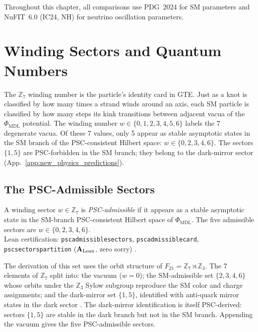 \documentclass[11pt,openany]{book}
\theoremstyle{remark}
\newcommand{\PHIMDL}{\Phi_{\mathrm{MDL}}}
\newcommand{\ZS}{\mathbb{Z}_7}
\newcommand{\lean}[1]{%
  \penalty-100
  \begingroup\def\_{\textunderscore\allowbreak}\texttt{#1}\endgroup}
\newcommand{\CatAL}{\ensuremath{\textbf{A}_{\rm Lean}}}
\begin{document}
Throughout this chapter, all comparisons use PDG~2024 \cite{ParticleDataGroup2024}
for SM parameters and NuFIT~6.0 (IC24, NH) \cite{NuFIT60} for neutrino oscillation
parameters.

\section{Winding Sectors and Quantum Numbers}
\label{sec:winding_qn}

The $\ZS$ winding number is the particle's identity card in GTE.  Just as a knot is
classified by how many times a strand winds around an axis, each SM particle is classified
by how many steps its kink transitions between adjacent vacua of the $\PHIMDL$ potential.
The winding number $w \in \{0,1,2,3,4,5,6\}$ labels the 7 degenerate vacua.  Of these
7 values, only 5 appear as stable asymptotic states in the SM branch of the
PSC-consistent Hilbert space: $w \in \{0,2,3,4,6\}$.  The sectors $\{1,5\}$ are
PSC-forbidden in the SM branch; they belong to the dark-mirror sector
\cite{Spivack2025UGP} (App.~\ref{app:new_physics_predictions}).

\subsection*{The PSC-Admissible Sectors}

\begin{tcolorbox}[colback=green!5,colframe=green!50!black,title={Definition: PSC-Admissible Winding Sector}]
A winding sector $w\in\ZS$ is \emph{PSC-admissible} if it appears as a stable
asymptotic state in the SM-branch PSC-consistent Hilbert space of $\PHIMDL$.
The five admissible sectors are $w\in\{0,2,3,4,6\}$.\\[2pt]
Lean certification: \lean{psc\_admissible\_sectors}, \lean{psc\_admissible\_card},
\lean{psc\_sectors\_partition} (\CatAL, zero sorry)
\cite{SpivackPhiMDLField,SpivackThreeTapeCMCA}.
\end{tcolorbox}

The derivation of this set uses the orbit structure of $F_{21} = \ZS \rtimes \mathbb{Z}_3$.
The 7 elements of $\ZS$ split into: the vacuum ($w=0$); the SM-admissible set
$\{2,3,4,6\}$ whose orbits under the $\mathbb{Z}_3$ Sylow subgroup reproduce the
SM color and charge assignments; and the dark-mirror set $\{1,5\}$, identified with
anti-quark mirror states in the dark sector \cite{Spivack2025UGP}.  The dark-mirror
identification is itself PSC-derived: sectors $\{1,5\}$ are stable in the dark branch
but not in the SM branch.  Appending the vacuum gives the five PSC-admissible sectors.
\end{document}
